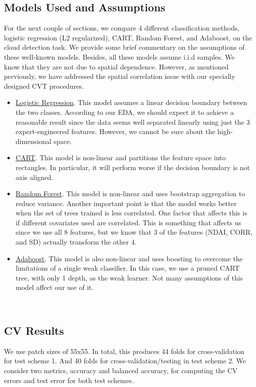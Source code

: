 \documentclass[11pt, letterpaper, journal]{IEEEtran}
\begin{document}
\subsection{Models Used and Assumptions}
For the next couple of sections, we compare 4 different classification methods, logistic regression (L2 regularized), CART, Random Forest, and Adaboost, on the cloud detection task. We provide some brief commentary on the assumptions of these well-known models. Besides, all these models assume i.i.d samples. We know that they are not due to spatial dependence. However, as mentioned previously, we have addressed the spatial correlation issue with our specially designed CVT procedures. 
\begin{itemize}
    \item \underline{Logistic Regression}. This model assumes a linear decision boundary between the two classes. According to our EDA, we should expect it to achieve a reasonable result since the data seems well separated linearly using just the 3 expert-engineered features. However, we cannot be sure about the high-dimensional space.
    \item \underline{CART}. This model is non-linear and partitions the feature space into rectangles. In particular, it will perform worse if the decision boundary is not axis aligned. 
    \item \underline{Random Forest}. This model is non-linear and uses bootstrap aggregation to reduce variance. Another important point is that the model works better when the set of trees trained is less correlated. One factor that affects this is if different covariates used are correlated. This is something that affects us since we use all 8 features, but we know that 3 of the features (NDAI, CORR, and SD) actually transform the other 4.
    \item \underline{Adaboost}. This model is also non-linear and uses boosting to overcome the limitations of a single weak classifier. In this case, we use a pruned CART tree, with only 1 depth, as the weak learner. Not many assumptions of this model affect our use of it.
\end{itemize}
\\


\subsection{CV Results}
We use patch sizes of 55x55. In total, this produces 44 folds for cross-validation for test scheme 1. And 40 folds for cross-validation/testing in test scheme 2. We consider two metrics, accuracy and balanced accuracy, for computing the CV errors and test error for both test schemes. 
\end{document}
